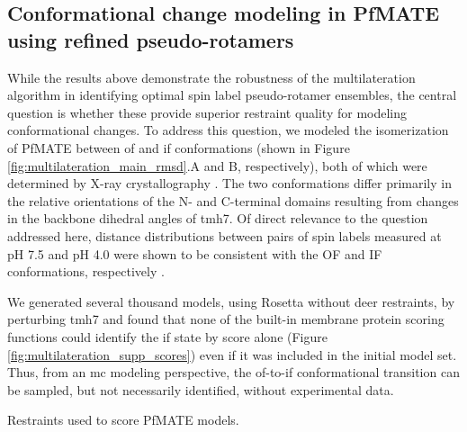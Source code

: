\subsection{Conformational change modeling in PfMATE using refined pseudo-rotamers}

While the results above demonstrate the robustness of the multilateration algorithm in identifying optimal spin label pseudo-rotamer ensembles, the central question is whether these provide superior restraint quality for modeling conformational changes. To address this question, we modeled the isomerization of PfMATE between \gls{of} and \gls{if} conformations (shown in Figure \ref{fig:multilateration_main_rmsd}.A and B, respectively), both of which were determined by X-ray crystallography \citep*{Tanaka2013, Zakrzewska2019}. The two conformations differ primarily in the relative orientations of the N- and C-terminal domains resulting from changes in the backbone dihedral angles of \gls{tmh}7. Of direct relevance to the question addressed here, distance distributions between pairs of spin labels measured at pH 7.5 and pH 4.0 were shown to be consistent with the OF and IF conformations, respectively \citep*{Jagessar2020}.



We generated several thousand models, using Rosetta \citep*{Leaver-fay2011, Leman2020} without \gls{deer} restraints, by perturbing \gls{tmh}7 and found that none of the built-in membrane protein scoring functions \citep*{Alford2020, Alford2015, Weinstein2019, Yarov-Yarovoy2006} could identify the \gls{if} state by score alone (Figure \ref{fig:multilateration_supp_scores}) even if it was included in the initial model set. Thus, from an \gls{mc} modeling perspective, the \gls{of}-to-\gls{if} conformational transition can be sampled, but not necessarily identified, without experimental data.

\begin{table}[h!]
\scriptsize
\renewcommand{\tabcolsep}{0.15cm}
\centering
\caption[Restraints used to score PfMATE models.]{Restraints used to score PfMATE models.}

\label{tab:pfmate_restraints}
\end{table}

